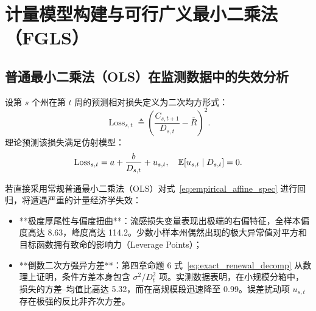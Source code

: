\section{计量模型构建与可行广义最小二乘法（FGLS）}\label{sec:fgls}

\subsection{普通最小二乘法（OLS）在监测数据中的失效分析}
设第 $s$ 个州在第 $t$ 周的预测相对损失定义为二次均方形式：
\begin{equation}
\operatorname{Loss}_{s,t} \triangleq \left( \frac{C_{s, t+1}}{D_{s,t}} - \bar{R} \right)^2.
\end{equation}
理论预测该损失满足仿射模型：
\begin{equation}
\operatorname{Loss}_{s,t} = a + \frac{b}{D_{s,t}} + u_{s,t}, \quad \operatorname{\mathbb{E}}[u_{s,t} \mid D_{s,t}] = 0. \label{eq:empirical_affine_spec}
\end{equation}

若直接采用常规普通最小二乘法（OLS）对式~\eqref{eq:empirical_affine_spec} 进行回归，将遭遇严重的计量经济学失效：
\begin{itemize}
    \item **极度厚尾性与偏度扭曲**：流感损失变量表现出极端的右偏特征，全样本偏度高达 8.63，峰度高达 114.2。少数小样本州偶然出现的极大异常值对平方和目标函数拥有致命的影响力（Leverage Points）；
    \item **倒数二次方强异方差**：第四章命题 6 式~\eqref{eq:exact_renewal_decomp} 从数理上证明，条件方差本身包含 $\sigma^2 / D_t^2$ 项。实测数据表明，在小规模分箱中，损失的方差--均值比高达 5.32，而在高规模段迅速降至 0.99。误差扰动项 $u_{s,t}$ 存在极强的反比非齐次方差。
\end{itemize}

